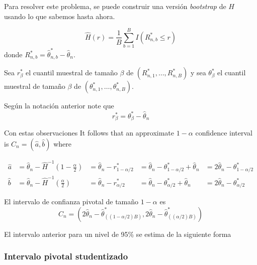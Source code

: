 \documentclass[12pt]{book}\usepackage[]{graphicx}\usepackage[]{color}
\theoremstyle{definition}
\theoremstyle{plain}
\begin{document}
Para resolver este problema, se puede construir una versión \emph{bootstrap} de \(H\) usando lo que sabemos hasta ahora.

\[
\widehat{H}(r)=\frac{1}{B} \sum_{b=1}^{B} I\left(R_{n, b}^{*} \leq r\right)
\]
donde \(R_{n, b}^{*}=\widehat{\theta}_{n, b}^{*}-\widehat{\theta}_{n}\).

Sea  \(r_{\beta}^{*}\) el cuantil muestral de tamaño  \(\beta\) de  \(\left(R_{n, 1}^{*}, \ldots, R_{n, B}^{*}\right)\) y sea \(\theta_{\beta}^{*}\) el cuantil muestral de tamaño  \(\beta\) de \(\left(\theta_{n, 1}^{*}, \ldots, \theta_{n, B}^{*}\right)\).
\begin{nota}{}{}
    Según la notación anterior note que
    \begin{equation*}
    r_{\beta}^{*}= \theta_{\beta}^{*}-\widehat{\theta}_{n}
    \end{equation*}
\end{nota}



 Con estas observaciones
  It follows that an approximate \(1-\alpha\) confidence interval is \(C_{n}=(\widehat{a}, \widehat{b})\) where

\begin{align*}
\widehat{a}
&= \widehat{\theta}_{n}-\widehat{H}^{-1}\left(1-\frac{\alpha}{2}\right)
&= \widehat{\theta}_{n}-r_{1-\alpha / 2}^{*}
&= \widehat{\theta}_{n}-\theta_{1-\alpha / 2}^{*} + \widehat{\theta}_{n}
&=2 \widehat{\theta}_{n}-\theta_{1-\alpha / 2}^{*} \\
\widehat{b} &=\widehat{\theta}_{n}-\widehat{H}^{-1}\left(\frac{\alpha}{2}\right)
&=\widehat{\theta}_{n}-r_{\alpha / 2}^{*}
&= \widehat{\theta}_{n}-\theta_{\alpha / 2}^{*} + \widehat{\theta}_{n}
&=2 \widehat{\theta}_{n}-\theta_{\alpha / 2}^{*}
\end{align*}

\begin{nota}{}{}
    El intervalo de confianza pivotal de tamaño \(1-\alpha\) es
    \[
    C_{n}=\left(2 \widehat{\theta}_{n}-\widehat{\theta}_{((1-\alpha / 2) B)}^{*}, 2 \widehat{\theta}_{n}-\widehat{\theta}_{((\alpha / 2) B)}^{*}\right)
    \]
\end{nota}
\begin{laboratorio}{}{}
    El intervalo anterior para un nivel de 95\% se estima de la siguiente forma

\end{laboratorio}

\subsubsection{Intervalo pivotal studentizado}
\end{document}
